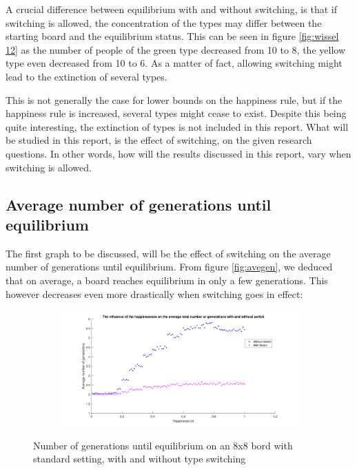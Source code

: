 A crucial difference between equilibrium with and without switching, is that if switching is allowed, the concentration of the types may differ between the starting board and the equilibrium status. 
This can be seen in figure \ref{fig:wissel 12} as the number of people of the green type decreased from 10 to 8, the yellow type even decreased from 10 to 6. 
As a matter of fact, allowing switching might lead to the extinction of several types. 

This is not generally the case for lower bounds on the happiness rule, but if the happiness rule is increased, several types might cease to exist. Despite this being quite interesting, the extinction of types is not included in this report.
What will be studied in this report, is the effect of switching, on the given research questions. In other words, how will the results discussed in this report, vary when switching is allowed. 
\newpage

\subsection{Average number of generations until equilibrium}\label{subsec:avegensw}
The first graph to be discussed, will be the effect of switching on the average number of generations until equilibrium. 
From figure \ref{fig:avegen}, we deduced that on average, a board reaches equilibrium in only a few generations. This however decreases even more drastically when switching goes in effect:

\begin{figure}[H]
	\centering
    \begin{subfigure}{0.9\textwidth}
        \includegraphics[width=\textwidth]{happinessrule-totaantgenwithswitchorwithoutswitch}
    \end{subfigure}
    \caption{Number of generations until equilibrium on an 8x8 bord with standard setting, with and without type switching}
    \label{fig:AantGenS}
\end{figure}

